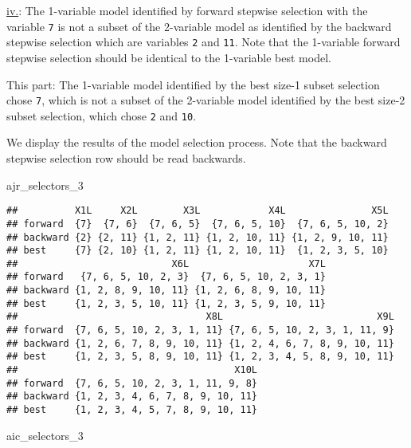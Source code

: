 \documentclass[
]{article}
\newenvironment{Shaded}{\begin{snugshade}}{\end{snugshade}}
\newcommand{\DecValTok}[1]{\textcolor[rgb]{0.00,0.00,0.81}{#1}}
\newcommand{\NormalTok}[1]{#1}
\begin{document}
\protect\hyperlink{threeciv}{iv.}: The 1-variable model identified by
forward stepwise selection with the variable \texttt{7} is not a subset
of the 2-variable model as identified by the backward stepwise selection
which are variables \texttt{2} and \texttt{11}. Note that the 1-variable
forward stepwise selection should be identical to the 1-variable best
model.

This part: The 1-variable model identified by the best size-1 subset
selection chose \texttt{7}, which is not a subset of the 2-variable
model identified by the best size-2 subset selection, which chose
\texttt{2} and \texttt{10}.

We display the results of the model selection process. Note that the
backward stepwise selection row should be read backwards.

\begin{Shaded}
\begin{Highlighting}[]
\NormalTok{ajr_selectors_}\DecValTok{3}
\end{Highlighting}
\end{Shaded}

\begin{verbatim}
##          X1L     X2L        X3L            X4L               X5L
## forward  {7}  {7, 6}  {7, 6, 5}  {7, 6, 5, 10}  {7, 6, 5, 10, 2}
## backward {2} {2, 11} {1, 2, 11} {1, 2, 10, 11} {1, 2, 9, 10, 11}
## best     {7} {2, 10} {1, 2, 11} {1, 2, 10, 11}  {1, 2, 3, 5, 10}
##                           X6L                     X7L
## forward   {7, 6, 5, 10, 2, 3}  {7, 6, 5, 10, 2, 3, 1}
## backward {1, 2, 8, 9, 10, 11} {1, 2, 6, 8, 9, 10, 11}
## best     {1, 2, 3, 5, 10, 11} {1, 2, 3, 5, 9, 10, 11}
##                                 X8L                           X9L
## forward  {7, 6, 5, 10, 2, 3, 1, 11} {7, 6, 5, 10, 2, 3, 1, 11, 9}
## backward {1, 2, 6, 7, 8, 9, 10, 11} {1, 2, 4, 6, 7, 8, 9, 10, 11}
## best     {1, 2, 3, 5, 8, 9, 10, 11} {1, 2, 3, 4, 5, 8, 9, 10, 11}
##                                      X10L
## forward  {7, 6, 5, 10, 2, 3, 1, 11, 9, 8}
## backward {1, 2, 3, 4, 6, 7, 8, 9, 10, 11}
## best     {1, 2, 3, 4, 5, 7, 8, 9, 10, 11}
\end{verbatim}

\begin{Shaded}
\begin{Highlighting}[]
\NormalTok{aic_selectors_}\DecValTok{3}
\end{Highlighting}
\end{Shaded}
\end{document}
